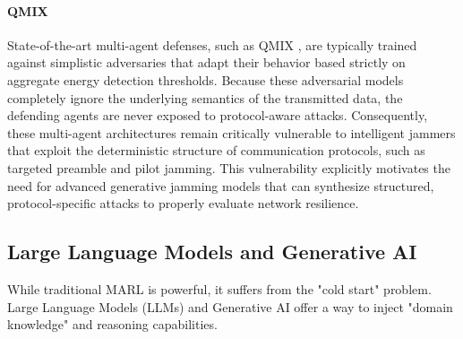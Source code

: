 \documentclass[conference]{IEEEtran}
\newcommand{\adm}[1]{{\color{orange}{[#1]}}}
\newcommand{\rar}[1]{{\color{blue}{[#1]}}}
\begin{document}
\paragraph{QMIX}
State-of-the-art multi-agent defenses, such as QMIX , are typically trained against simplistic adversaries that adapt their behavior based strictly on aggregate energy detection thresholds.
Because these adversarial models completely ignore the underlying semantics of the transmitted data, the defending agents are never exposed to protocol-aware attacks.
Consequently, these multi-agent architectures remain critically vulnerable to intelligent jammers that exploit the deterministic structure of communication protocols, such as targeted preamble and pilot jamming.
This vulnerability explicitly motivates the need for advanced generative jamming models that can synthesize structured, protocol-specific attacks to properly evaluate network resilience.




\subsection{Large Language Models and Generative AI}

While traditional MARL is powerful, it suffers from the "cold start" problem.
Large Language Models (LLMs) and Generative AI offer a way to inject "domain knowledge" and reasoning capabilities.
\adm{hypothesis to be verified. when does the higher compute of an LLM outperform smaller, more efficient narrow-task models?}
\rar{research?}
\end{document}
